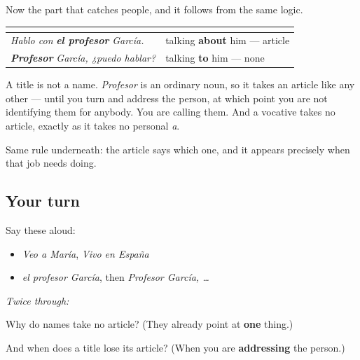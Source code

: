 \begin{culture}
Now the part that catches people, and it follows from the same logic.

\noindent
\begin{tabularx}{\linewidth}{@{}>{\raggedright\arraybackslash}X>{\raggedright\arraybackslash}X@{}}
\toprule
\textbf{} & \textbf{} \\
\midrule
\emph{Hablo con} \emph{\textbf{el profesor}} \emph{García.} & talking \textbf{about} him — article \\
\emph{\textbf{Profesor}} \emph{García, ¿puedo hablar?} & talking \textbf{to} him — none \\
\bottomrule
\end{tabularx}

A title is not a name. \emph{Profesor} is an ordinary noun, so it takes an article like any other — until you turn and address the person, at which point you are not identifying them for anybody. You are calling them. And a vocative takes no article, exactly as it takes no personal \emph{a}.

Same rule underneath: the article says which one, and it appears precisely when that job needs doing.
\end{culture}

\subsection*{Your turn}
Say these aloud:

\begin{itemize}
\raggedright
  \item \emph{Veo a María}, \emph{Vivo en España}
  \item \emph{el profesor García}, then \emph{Profesor García, …}
\end{itemize}

\emph{Twice through:}

\begin{tcolorbox}[breakable,colback=teal!4,colframe=teal!35!black,title={Before you move on}]
Why do names take no article? (They already point at \textbf{one} thing.)

And when does a title lose its article? (When you are \textbf{addressing} the person.)
\end{tcolorbox}

